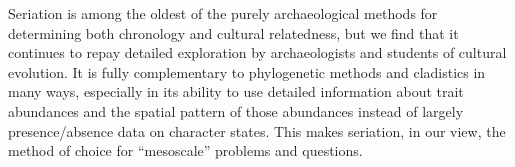 Seriation is among the oldest of the purely archaeological methods for
determining both chronology and cultural relatedness, but we find that
it continues to repay detailed exploration by archaeologists and
students of cultural evolution. It is fully complementary to
phylogenetic methods and cladistics in many ways, especially in its
ability to use detailed information about trait abundances and the
spatial pattern of those abundances instead of largely presence/absence
data on character states. This makes seriation, in our view, the method
of choice for ``mesoscale'' problems and questions.


